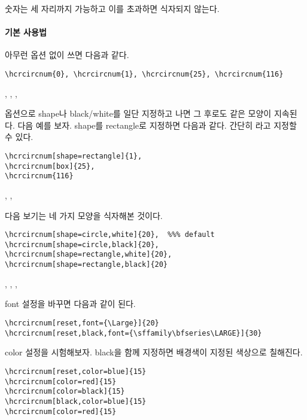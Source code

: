 숫자는 세 자리까지 가능하고 이를 초과하면 %
식자되지 않는다.

\paragraph{기본 사용법}

아무런 옵션 없이 쓰면 다음과 같다.
\begin{verbatim}
\hcrcircnum{0}, \hcrcircnum{1}, \hcrcircnum{25}, \hcrcircnum{116}
\end{verbatim}
, , , 

\medskip

옵션으로 shape나 black/white를 일단 지정하고 나면 그 후로도 같은 모양이 지속된다. 다음 예를 보자. shape를 rectangle로 지정하면 다음과 같다. 간단히 라고 지정할 수 있다.
\begin{verbatim}
\hcrcircnum[shape=rectangle]{1},
\hcrcircnum[box]{25},
\hcrcircnum{116}
\end{verbatim}
,
,

\medskip

다음 보기는 네 가지 모양을 식자해본 것이다.
\begin{verbatim}
\hcrcircnum[shape=circle,white]{20},  %%% default
\hcrcircnum[shape=circle,black]{20},
\hcrcircnum[shape=rectangle,white]{20},
\hcrcircnum[shape=rectangle,black]{20}
\end{verbatim}
,  %
,
,

\medskip

font 설정을 바꾸면 다음과 같이 된다.
\begin{verbatim}
\hcrcircnum[reset,font={\Large}]{20}
\hcrcircnum[reset,black,font={\sffamily\bfseries\LARGE}]{30}
\end{verbatim}

\medskip

color 설정을 시험해보자. black을 함께 지정하면 배경색이 지정된 색상으로 칠해진다.
\begin{verbatim}
\hcrcircnum[reset,color=blue]{15}
\hcrcircnum[color=red]{15}
\hcrcircnum[color=black]{15}
\hcrcircnum[black,color=blue]{15}
\hcrcircnum[color=red]{15}
\end{verbatim}

